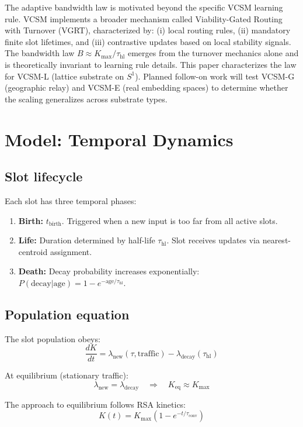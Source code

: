 \documentclass[11pt]{article}
\begin{document}
The adaptive bandwidth law is motivated beyond the specific VCSM learning rule. VCSM implements a broader mechanism called Viability-Gated Routing with Turnover (VGRT), characterized by: (i) local routing rules, (ii) mandatory finite slot lifetimes, and (iii) contrastive updates based on local stability signals. The bandwidth law $B \approx K_{\max} / \tau_{\text{hl}}$ emerges from the turnover mechanics alone and is theoretically invariant to learning rule details. This paper characterizes the law for VCSM-L (lattice substrate on $S^1$). Planned follow-on work will test VCSM-G (geographic relay) and VCSM-E (real embedding spaces) to determine whether the scaling generalizes across substrate types.

\section{Model: Temporal Dynamics}

\subsection{Slot lifecycle}

Each slot has three temporal phases:
\begin{enumerate}
  \item \textbf{Birth:} $t_{\text{birth}}$. Triggered when a new input is too far from all active slots.
  \item \textbf{Life:} Duration determined by half-life $\tau_{\text{hl}}$. Slot receives updates via nearest-centroid assignment.
  \item \textbf{Death:} Decay probability increases exponentially: $P(\text{decay} | \text{age}) = 1 - e^{-\text{age}/\tau_{\text{hl}}}$.
\end{enumerate}

\subsection{Population equation}

The slot population obeys:
\[
  \frac{dK}{dt} = \lambda_{\text{new}}(\tau, \text{traffic}) - \lambda_{\text{decay}}(\tau_{\text{hl}})
\]

At equilibrium (stationary traffic):
\[
  \lambda_{\text{new}} = \lambda_{\text{decay}} \quad \Rightarrow \quad K_{\text{eq}} \approx K_{\max}
\]

The approach to equilibrium follows RSA kinetics:
\[
  K(t) = K_{\max}\left(1 - e^{-t/\tau_{\text{conv}}}\right)
\]
\end{document}
